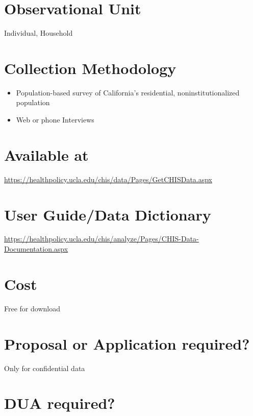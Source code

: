 \documentclass[
]{book}
\providecommand{\tightlist}{%
  \setlength{\itemsep}{0pt}\setlength{\parskip}{0pt}}
\begin{document}
\hypertarget{observational-unit-14}{%
\section{Observational Unit}\label{observational-unit-14}}

Individual, Household

\hypertarget{collection-methodology-14}{%
\section{Collection Methodology}\label{collection-methodology-14}}

\begin{itemize}
\tightlist
\item
  Population-based survey of California's residential, noninstitutionalized population
\item
  Web or phone Interviews
\end{itemize}

\hypertarget{available-at-14}{%
\section{Available at}\label{available-at-14}}

\url{https://healthpolicy.ucla.edu/chis/data/Pages/GetCHISData.aspx}

\hypertarget{user-guidedata-dictionary-14}{%
\section{User Guide/Data Dictionary}\label{user-guidedata-dictionary-14}}

\url{https://healthpolicy.ucla.edu/chis/analyze/Pages/CHIS-Data-Documentation.aspx}

\hypertarget{cost-14}{%
\section{Cost}\label{cost-14}}

Free for download

\hypertarget{proposal-or-application-required-14}{%
\section{Proposal or Application required?}\label{proposal-or-application-required-14}}

Only for confidential data

\hypertarget{dua-required-14}{%
\section{DUA required?}\label{dua-required-14}}
\end{document}
